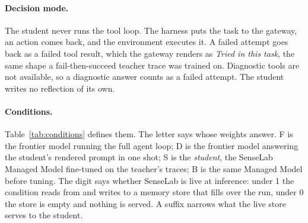 \documentclass[11pt]{article}
\newcommand{\cond}[1]{\textsf{#1}}
\begin{document}
\paragraph{Decision mode.} The student never runs the tool loop. The harness puts the task
to the gateway, an action comes back, and the environment executes it. A failed attempt goes
back as a failed tool result, which the gateway renders as \emph{Tried in this task}, the
same shape a fail-then-succeed teacher trace was trained on. Diagnostic tools are not
available, so a diagnostic answer counts as a failed attempt. The student writes no
reflection of its own.

\paragraph{Conditions.} Table~\ref{tab:conditions} defines them. The letter says whose
weights answer. \cond{F} is the frontier model running the full agent loop; \cond{D} is the
frontier model answering the student's rendered prompt in one shot; \cond{S} is the
\emph{student}, the SenseLab Managed Model fine-tuned on the teacher's traces; \cond{B} is
the same Managed Model before tuning. The digit says whether SenseLab is live at inference:
under \cond{1} the condition reads from and writes to a memory store that fills over the
run, under \cond{0} the store is empty and nothing is served. A suffix narrows what the live
store serves to the student.
\end{document}
